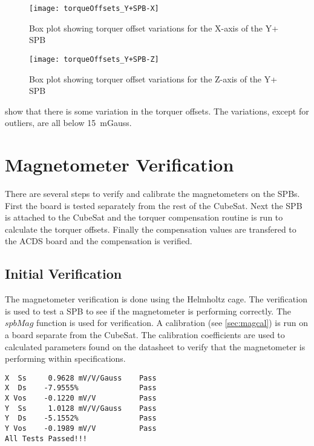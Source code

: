 \begin{figure}[!htb]
    \centering
    \texttt{[image: torqueOffsets\_Y+SPB-X]}
    \caption{Box plot showing torquer offset variations for the X-axis of the Y+ SPB}
    \label{fig:tqoff1}
\end{figure}

\begin{figure}[!htb]
    \centering
    \texttt{[image: torqueOffsets\_Y+SPB-Z]}
    \caption{Box plot showing torquer offset variations for the Z-axis of the Y+ SPB}
    \label{fig:tqoff2}
\end{figure}

 show that there is some variation in the torquer offsets. The variations, except for outliers, are all below \textpm{}15~mGauss. 

\section{Magnetometer Verification}

There are several steps to verify and calibrate the magnetometers on the \acp{SPB}. First the board is tested separately from the rest of the CubeSat. Next the \ac{SPB} is attached to the CubeSat and the torquer compensation routine is run to calculate the torquer offsets. Finally the compensation values are transfered to the \ac{ACDS} board and the compensation is verified.


\subsection{Initial Verification}

The magnetometer verification is done using the Helmholtz cage. The verification is used to test a \ac{SPB} to see if the magnetometer is performing correctly. The \lstMat$spbMag$ function is used for verification. A calibration (see \cref{sec:magcal}) is run on a board separate from the CubeSat. The calibration coefficients are used to calculated parameters found on the datasheet to verify that the magnetometer is performing within specifications.

\begin{minipage}{\linewidth}
\begin{lstlisting}[caption={\ac{SPB} verification results},label={lst:vspb-res},language=verbatim,style=verbatim]
X  Ss     0.9628 mV/V/Gauss    Pass
X  Ds    -7.9555%              Pass
X Vos    -0.1220 mV/V          Pass
Y  Ss     1.0128 mV/V/Gauss    Pass
Y  Ds    -5.1552%              Pass
Y Vos    -0.1989 mV/V          Pass
All Tests Passed!!!
\end{lstlisting}
\end{minipage}

